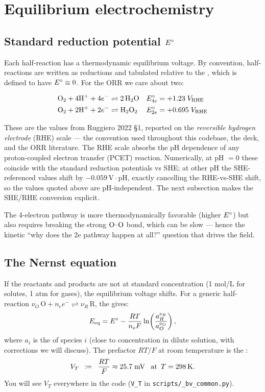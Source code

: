\documentclass[11pt]{article}
\begin{document}
\section{Equilibrium electrochemistry}

\subsection{Standard reduction potential $E^{\circ}$}

Each half-reaction has a thermodynamic equilibrium voltage. By
convention, half-reactions are written as reductions and tabulated
relative to the , which
is defined to have $E^{\circ} \equiv 0$. For the ORR we care about two:

\begin{align}
  \mathrm{O_2} + 4\mathrm{H^+} + 4 e^- &\rightleftharpoons 2\,\mathrm{H_2O} &
  &E^{\circ}_{4e} = +1.23\;V_{\mathrm{RHE}} \\
  \mathrm{O_2} + 2\mathrm{H^+} + 2 e^- &\rightleftharpoons \mathrm{H_2O_2} &
  &E^{\circ}_{2e} = +0.695\;V_{\mathrm{RHE}}
\end{align}

These are the values from Ruggiero 2022 \S 1, reported on the
\emph{reversible hydrogen electrode} (RHE) scale --- the convention
used throughout this codebase, the deck, and the ORR literature. The
RHE scale absorbs the pH dependence of any proton-coupled electron
transfer (PCET) reaction. Numerically, at pH $= 0$ these coincide
with the standard reduction potentials vs SHE; at other pH the
SHE-referenced values shift by $-0.059\,\mathrm{V}\cdot\mathrm{pH}$,
exactly cancelling the RHE-vs-SHE shift, so the values quoted above
are pH-independent. The next subsection makes the SHE/RHE conversion
explicit.

The 4-electron pathway is more thermodynamically favorable (higher
$E^{\circ}$) but also requires breaking the strong $\mathrm{O}\text{--}\mathrm{O}$
bond, which can be slow --- hence the kinetic ``why does the 2e
pathway happen at all?'' question that drives the field.

\subsection{The Nernst equation}

If the reactants and products are not at standard concentration
(1 mol/L for solutes, 1 atm for gases), the equilibrium voltage
shifts. For a generic half-reaction
$\nu_O \,\mathrm{O} + n_e e^- \rightleftharpoons \nu_R\,\mathrm{R}$,
the  gives:
\begin{equation}
  E_{\mathrm{eq}} = E^{\circ} - \frac{RT}{n_e F} \ln\!\left(
    \frac{a_R^{\nu_R}}{a_O^{\nu_O}}\right),
  \label{eq:nernst}
\end{equation}
where $a_i$ is the  of species $i$ (close to
concentration in dilute solution, with corrections we will discuss).
The prefactor $RT/F$ at room temperature is the
:
\[
  V_T \;\;\coloneqq\;\; \frac{RT}{F} \approx 25.7 \;\text{mV \, at \,} T = 298\,\mathrm{K}.
\]
You will see $V_T$ everywhere in the code (\texttt{V\_T} in
\texttt{scripts/\_bv\_common.py}).
\end{document}
